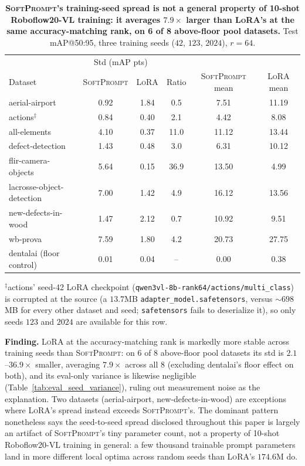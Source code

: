 \documentclass{article}
\newcommand{\ours}{\textsc{SoftPrompt}}
\newcommand{\lora}{\textsc{LoRA}}
\newcommand{\rftwenty}{Roboflow20-VL}
\newenvironment{finding}
  {\par\smallskip\noindent\begin{lrbox}{\findingbox}%
   \begin{minipage}{\dimexpr\linewidth-2\fboxsep-2\fboxrule\relax}\small}
  {\end{minipage}\end{lrbox}%
   \setlength{\fboxrule}{0.9pt}%
   \noindent\fcolorbox{findingframe}{findingback}{\usebox{\findingbox}}\par\smallskip}
\begin{document}
\begin{table}[h]
  \centering
  \caption{\textbf{\ours{}'s training-seed spread is not a general property of 10-shot \rftwenty{} training: it averages $7.9\times$ larger than \lora{}'s at the same accuracy-matching rank, on 6 of 8 above-floor pool datasets.} Test mAP@50:95, three training seeds ($42$, $123$, $2024$), $r{=}64$.}
  \label{tab:lora_seed_variance}
  \small
  \setlength{\tabcolsep}{6pt}
  \begin{tabular}{lccc|cc}
    \toprule
    & \multicolumn{2}{c}{Std (mAP pts)} & & & \\
    Dataset & \ours{} & \lora{} & Ratio & \ours{} mean & \lora{} mean \\
    \midrule
    aerial-airport             & 0.92 & 1.84 & 0.5 &  7.51 & 11.19 \\
    actions$^{\ddagger}$       & 0.84 & 0.40 & 2.1 &  4.42 &  8.08 \\
    all-elements                & 4.10 & 0.37 & 11.0 & 11.12 & 13.44 \\
    defect-detection            & 1.43 & 0.48 & 3.0 &  6.31 & 10.12 \\
    flir-camera-objects         & 5.64 & 0.15 & 36.9 & 13.50 &  4.99 \\
    lacrosse-object-detection   & 7.00 & 1.42 & 4.9 & 16.12 & 13.56 \\
    new-defects-in-wood         & 1.47 & 2.12 & 0.7 & 10.92 &  9.51 \\
    wb-prova                    & 7.59 & 1.80 & 4.2 & 20.73 & 27.75 \\
    \midrule
    dentalai (floor control)    & 0.01 & 0.04 & \multicolumn{1}{c}{--} & 0.00 & 0.38 \\
    \bottomrule
  \end{tabular}
\end{table}
$^{\ddagger}$actions' seed-42 \lora{} checkpoint (\texttt{qwen3vl-8b-rank64/actions/multi\_class}) is corrupted at the source (a $13.7$MB \texttt{adapter\_model.safetensors}, versus $\sim\!698$MB for every other dataset and seed; \texttt{safetensors} fails to deserialize it), so only seeds $123$ and $2024$ are available for this row.

\begin{finding} \textbf{Finding.} \lora{} at the accuracy-matching rank is markedly more stable across training seeds than \ours{}: on 6 of 8 above-floor pool datasets its std is $2.1$--$36.9\times$ smaller, averaging $7.9\times$ across all 8 (excluding dentalai's floor effect on both), and its eval-only variance is likewise negligible (Table~\ref{tab:eval_seed_variance}), ruling out measurement noise as the explanation. Two datasets (aerial-airport, new-defects-in-wood) are exceptions where \lora{}'s spread instead exceeds \ours{}'s. The dominant pattern nonetheless says the seed-to-seed spread disclosed throughout this paper is largely an artifact of \ours{}'s tiny parameter count, not a property of 10-shot \rftwenty{} training in general: a few thousand trainable prompt parameters land in more different local optima across random seeds than \lora{}'s $174.6$M do.
\end{finding}
\end{document}
